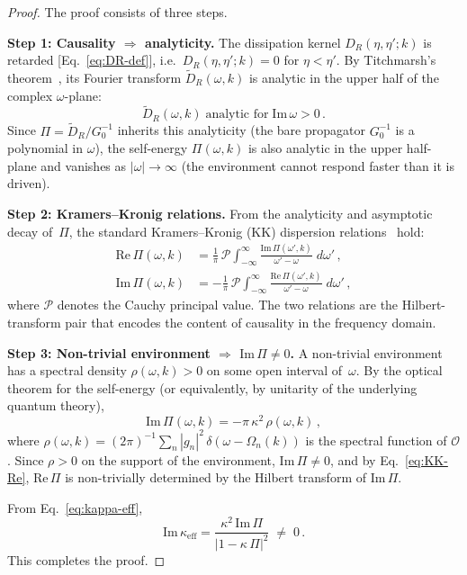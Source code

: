 \documentclass[12pt,a4paper]{article}
\begin{document}
\begin{proof}
The proof consists of three steps.

\medskip\noindent\textbf{Step 1: Causality $\Rightarrow$ analyticity.}
The dissipation kernel $D_{R}(\eta,\eta';k)$ is retarded
[Eq.~\eqref{eq:DR-def}], i.e.\
$D_{R}(\eta,\eta';k)=0$ for $\eta<\eta'$.  By Titchmarsh's
theorem~\cite{Titchmarsh1948}, its Fourier transform
$\widetilde{D}_{R}(\omega,k)$ is analytic in the upper half of the
complex $\omega$-plane:
\begin{equation}\label{eq:analyticity}
  \widetilde{D}_{R}(\omega,k)\;\text{analytic for}\;
  \mathrm{Im}\,\omega>0\,.
\end{equation}
Since $\Pi=\widetilde{D}_{R}/G_{0}^{-1}$ inherits this analyticity
(the bare propagator $G_{0}^{-1}$ is a polynomial in $\omega$), the
self-energy $\Pi(\omega,k)$ is also analytic in the upper half-plane
and vanishes as $|\omega|\to\infty$ (the environment cannot respond
faster than it is driven).

\medskip\noindent\textbf{Step 2: Kramers--Kronig relations.}
From the analyticity and asymptotic decay of~$\Pi$, the standard
Kramers--Kronig (KK) dispersion relations~\cite{KramersKronig,Nussenzveig1972}
hold:
\begin{subequations}\label{eq:KK}
\begin{align}
  \mathrm{Re}\,\Pi(\omega,k)
  &= \frac{1}{\pi}\,\mathcal{P}\!\!\int_{-\infty}^{\infty}
     \frac{\mathrm{Im}\,\Pi(\omega',k)}{\omega'-\omega}\;d\omega'\,,
  \label{eq:KK-Re}\\[4pt]
  \mathrm{Im}\,\Pi(\omega,k)
  &= -\frac{1}{\pi}\,\mathcal{P}\!\!\int_{-\infty}^{\infty}
     \frac{\mathrm{Re}\,\Pi(\omega',k)}{\omega'-\omega}\;d\omega'\,,
  \label{eq:KK-Im}
\end{align}
\end{subequations}
where $\mathcal{P}$ denotes the Cauchy principal value.  The two
relations are the Hilbert-transform pair that encodes the content of
causality in the frequency domain.

\medskip\noindent\textbf{Step 3: Non-trivial environment
  $\Rightarrow$ $\mathrm{Im}\,\Pi\neq 0$.}
A non-trivial environment has a spectral density $\rho(\omega,k)>0$
on some open interval of~$\omega$.  By the optical theorem for the
self-energy (or equivalently, by unitarity of the underlying quantum
theory),
\begin{equation}\label{eq:optical}
  \mathrm{Im}\,\Pi(\omega,k)
  = -\pi\,\kappa^{2}\,\rho(\omega,k)\,,
\end{equation}
where $\rho(\omega,k)=
(2\pi)^{-1}\sum_{n}|g_{n}|^{2}\,\delta(\omega-\Omega_{n}(k))$ is the
spectral function of $\mathcal{O}$.  Since $\rho>0$ on the support of
the environment, $\mathrm{Im}\,\Pi\neq 0$, and by
Eq.~\eqref{eq:KK-Re}, $\mathrm{Re}\,\Pi$ is non-trivially determined
by the Hilbert transform of $\mathrm{Im}\,\Pi$.

From Eq.~\eqref{eq:kappa-eff},
\begin{equation}\label{eq:Im-kappa}
  \mathrm{Im}\,\kappa_{\mathrm{eff}}
  = \frac{\kappa^{2}\,\mathrm{Im}\,\Pi}
         {|1-\kappa\,\Pi|^{2}}
  \;\neq\; 0\,.
\end{equation}
This completes the proof.
\end{proof}
\end{document}
